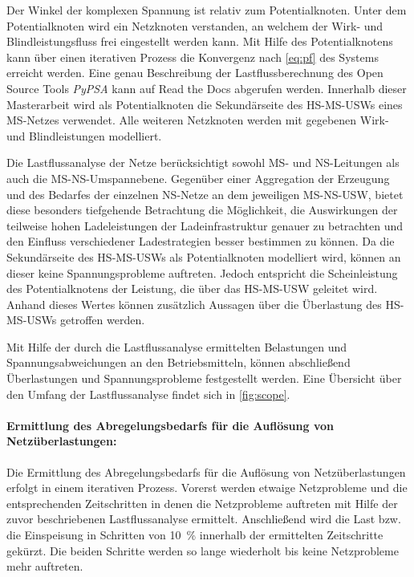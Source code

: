 Der Winkel der komplexen Spannung ist relativ zum Potentialknoten.
Unter dem Potentialknoten wird ein Netzknoten verstanden, an welchem der Wirk- und Blindleistungsfluss frei eingestellt werden kann.
Mit Hilfe des Potentialknotens kann über einen iterativen Prozess die Konvergenz nach \autoref{eq:pf} des Systems erreicht werden.
Eine genau Beschreibung der Lastflussberechnung des Open Source Tools \textit{PyPSA} kann auf Read the Docs \cite{Brown2020a} abgerufen werden.
Innerhalb dieser Masterarbeit wird als Potentialknoten die Sekundärseite des \gls{HS}-\gls{MS}-\glspl{USW} eines \gls{MS}-Netzes verwendet.
Alle weiteren Netzknoten werden mit gegebenen Wirk- und Blindleistungen modelliert. \cite{Schachler}\medskip

Die Lastflussanalyse der Netze berücksichtigt sowohl \gls{MS}- und \gls{NS}-Leitungen als auch die \gls{MS}-\gls{NS}-Umspannebene.
Gegenüber einer Aggregation der Erzeugung und des Bedarfes der einzelnen \gls{NS}-Netze an dem jeweiligen \gls{MS}-\gls{NS}-\gls{USW}, bietet diese besonders tiefgehende Betrachtung die Möglichkeit, die Auswirkungen der teilweise hohen Ladeleistungen der Ladeinfrastruktur genauer zu betrachten und den Einfluss verschiedener Ladestrategien besser bestimmen zu können.
Da die Sekundärseite des \gls{HS}-\gls{MS}-\glspl{USW} als Potentialknoten modelliert wird, können an dieser keine Spannungsprobleme auftreten.
Jedoch entspricht die Scheinleistung des Potentialknotens der Leistung, die über das \gls{HS}-\gls{MS}-\gls{USW} geleitet wird.
Anhand dieses Wertes können zusätzlich Aussagen über die Überlastung des \gls{HS}-\gls{MS}-\glspl{USW} getroffen werden.\medskip

Mit Hilfe der durch die Lastflussanalyse ermittelten Belastungen und Spannungsabweichungen an den Betriebsmitteln, können abschließend Überlastungen und Spannungsprobleme festgestellt werden.
Eine Übersicht über den Umfang der Lastflussanalyse findet sich in \autoref{fig:scope}. \cite{Schachler}




\paragraph{Ermittlung des Abregelungsbedarfs für die Auflösung von Netzüberlastungen:}

Die Ermittlung des Abregelungsbedarfs für die Auflösung von Netzüberlastungen erfolgt in einem iterativen Prozess.
Vorerst werden etwaige Netzprobleme und die entsprechenden Zeitschritten in denen die Netzprobleme auftreten mit Hilfe der zuvor beschriebenen Lastflussanalyse ermittelt.
Anschließend wird die Last bzw. die Einspeisung in Schritten von \SI{10}{\percent} innerhalb der ermittelten Zeitschritte gekürzt.
Die beiden Schritte werden so lange wiederholt bis keine Netzprobleme mehr auftreten.\medskip

